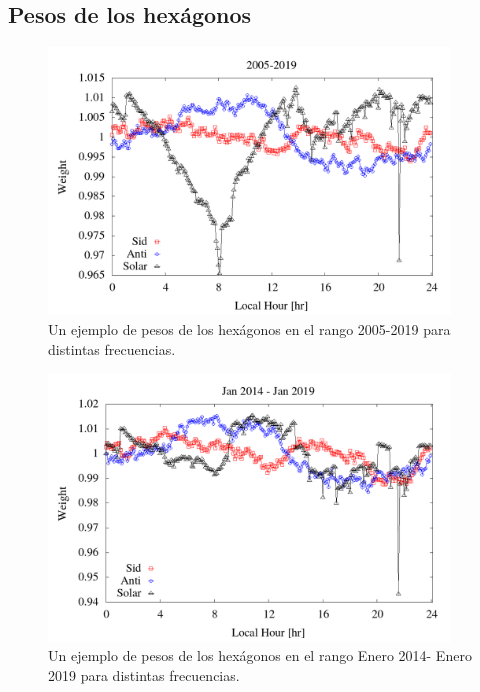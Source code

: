  



\subsection{Pesos de los hexágonos}


\begin{figure}[htbp]
  \centering
  \includegraphics[width=0.95\textwidth]{../report_2_27_04_2020/weigth2005-2019.png}
  \caption{Un ejemplo de pesos de los hexágonos en el rango 2005-2019 para distintas frecuencias.}
\end{figure}

 


\begin{figure}[htbp]
  \centering
  \includegraphics[width=0.95\textwidth]{../../Plotting/weigth2014-2019_jan.png}
  \caption{Un ejemplo de pesos de los hexágonos en el rango Enero 2014- Enero 2019 para distintas frecuencias.}
\end{figure}

